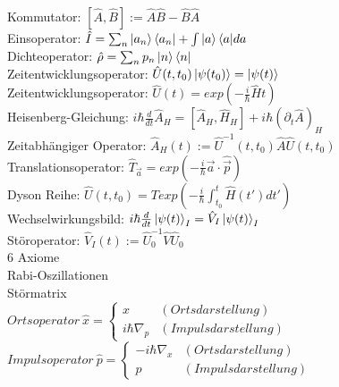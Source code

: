 \documentclass{article}
\begin{document}
Kommutator: $[\hat{A}, \hat{B}] := \hat{A}\hat{B} - \hat{B}\hat{A}$ \\

Einsoperator: $\hat{I}=\sum_n{\ket{a_n}\bra{a_n}} + \int{\ket{a}\bra{a}}da$ \\

Dichteoperator: $\hat{\rho}=\sum_n{p_n \ket{n}\bra{n}}$ \\

Zeitentwicklungsoperator: $\hat{U}(t, t_0)\ket{\psi(t_0)} = \ket{\psi(t)}$ \\

Zeitentwicklungsoperator: $\hat{U}(t) = exp(-\frac{i}{\hbar}\hat{H}t) $ \\

Heisenberg-Gleichung: $i \hbar \frac{d}{dt} \hat{A}_H = \left[ \hat{A}_H, \hat{H}_H \right] + i \hbar \left( \partial_t \hat{A} \right)_H $\\

Zeitabh\"angiger Operator: $\hat{A}_H(t) := \hat{U}^{-1}(t, t_0) \hat{A} \hat{U}(t, t_0)$ \\

Translationsoperator: $\hat{T}_{\vec{a}} = exp \left( - \frac{i}{\hbar} \vec{a} \cdot \hat{\vec{p}} \right)$ \\

Dyson Reihe:  $\hat{U}(t, t_0) = T exp\left(-\frac{i}{\hbar} \int_{t_0}^t{\hat{H}(t')}dt' \right)$ \\

Wechselwirkungsbild:  $i \hbar \frac{d}{dt} \ket{\psi(t)}_I = \hat{V}_I \ket{\psi(t)}_I$ \\

St\"oroperator: $\hat{V}_I(t) := \hat{U}_0^{-1} \hat{V} \hat{U}_0$ \\

6 Axiome \\ 

Rabi-Oszillationen \\

St\"ormatrix \\

$Ortsoperator\ \hat{x}=\left\{\begin{array}{ll} 
x & (Ortsdarstellung) \\
i \hbar \nabla_p & (Impulsdarstellung)
\end{array}\right.$ \\

$Impulsoperator\ \hat{p}=\left\{\begin{array}{ll}  
- i \hbar \nabla_x & (Ortsdarstellung) \\
p & (Impulsdarstellung)
\end{array}\right.$ \\
\end{document}
